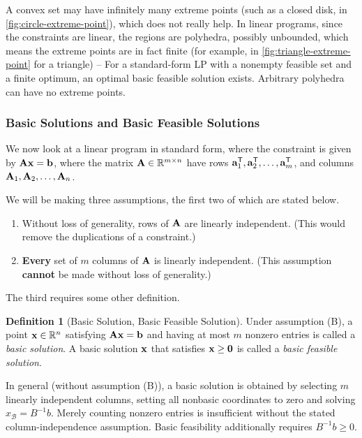 \documentclass[11pt]{article}
\theoremstyle{definition}
\newtheorem{definition}[theorem]{Definition}
\theoremstyle{remark}
\newcommand{\RR}{\mathbb{R}}
\newcommand{\transpose}{^{\mathsf{T}}}
\begin{document}
A convex set may have infinitely many extreme points (such as a closed disk, in \autoref{fig:circle-extreme-point}), which does not really help. In linear programs, since the constraints are linear, the regions are polyhedra, possibly unbounded, which means the extreme points are in fact finite (for example, in \autoref{fig:triangle-extreme-point} for a triangle) -- For a standard-form LP with a nonempty feasible set and a finite optimum, an optimal basic feasible solution exists. Arbitrary polyhedra can have no extreme points.

\subsubsection{Basic Solutions and Basic Feasible Solutions}

We now look at a linear program in standard form, where the constraint is given by \(\vb{A} \vb{x} = \vb{b}\), where the matrix \(\vb{A} \in \RR^{m \times n}\) have rows \(\vb{a}_1\transpose, \vb{a}_2\transpose, \ldots, \vb{a}_m\transpose\), and columns \(\vb{A}_1, \vb{A}_2, \ldots, \vb{A}_n\).

We will be making three assumptions, the first two of which are stated below.

\begin{enumerate}[label=(\Alph*)]
    \item Without loss of generality, rows of \(\vb{A}\) are linearly independent. (This would remove the duplications of a constraint.)
    \item \textbf{Every} set of \(m\) columns of \(\vb{A}\) is linearly independent. (This assumption \textbf{cannot} be made without loss of generality.)
\end{enumerate}

The third requires some other definition.

\begin{definition}[Basic Solution, Basic Feasible Solution]\label{optim-unit-0048}
    Under assumption (B), a point \(\vb{x}\in\RR^n\) satisfying \(\vb{Ax}=\vb{b}\) and having at most \(m\) nonzero entries is called a \emph{basic solution}. A basic solution \(\vb{x}\) that satisfies \(\vb{x} \geq \vb{0}\) is called a \emph{basic feasible solution}.
\end{definition}

In general (without assumption (B)), a basic solution is obtained by selecting
\(m\) linearly independent columns, setting all nonbasic coordinates to zero and
solving \(x_{\mathcal B}=B^{-1}b\). Merely counting nonzero entries is insufficient
without the stated column-independence assumption. Basic feasibility additionally
requires \(B^{-1}b\ge0\).
\end{document}

